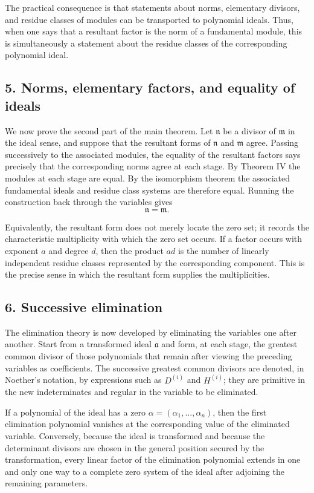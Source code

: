 \documentclass[11pt]{article}
\begin{document}
The practical consequence is that statements about norms, elementary divisors, and residue classes of modules can be transported to polynomial ideals. Thus, when one says that a resultant factor is the norm of a fundamental module, this is simultaneously a statement about the residue classes of the corresponding polynomial ideal.

\subsection{5. Norms, elementary factors, and equality of ideals}

We now prove the second part of the main theorem. Let $\mathfrak n$ be a divisor of $\mathfrak m$ in the ideal sense, and suppose that the resultant forms of $\mathfrak n$ and $\mathfrak m$ agree. Passing successively to the associated modules, the equality of the resultant factors says precisely that the corresponding norms agree at each stage. By Theorem IV the modules at each stage are equal. By the isomorphism theorem the associated fundamental ideals and residue class systems are therefore equal. Running the construction back through the variables gives
\[
  \mathfrak n=\mathfrak m.
\]

Equivalently, the resultant form does not merely locate the zero set; it records the characteristic multiplicity with which the zero set occurs. If a factor occurs with exponent $a$ and degree $d$, then the product $ad$ is the number of linearly independent residue classes represented by the corresponding component. This is the precise sense in which the resultant form supplies the multiplicities.

\subsection{6. Successive elimination}

The elimination theory is now developed by eliminating the variables one after another. Start from a transformed ideal $\mathfrak a$ and form, at each stage, the greatest common divisor of those polynomials that remain after viewing the preceding variables as coefficients. The successive greatest common divisors are denoted, in Noether's notation, by expressions such as $D^{(i)}$ and $H^{(i)}$; they are primitive in the new indeterminates and regular in the variable to be eliminated.

If a polynomial of the ideal has a zero $\alpha=(\alpha_1,\ldots,\alpha_n)$, then the first elimination polynomial vanishes at the corresponding value of the eliminated variable. Conversely, because the ideal is transformed and because the determinant divisors are chosen in the general position secured by the transformation, every linear factor of the elimination polynomial extends in one and only one way to a complete zero system of the ideal after adjoining the remaining parameters.
\end{document}

